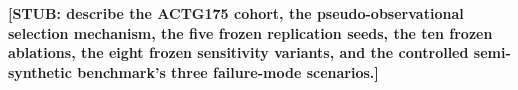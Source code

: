 \textbf{[STUB: describe the ACTG175 cohort, the pseudo-observational
selection mechanism, the five frozen replication seeds, the ten frozen
ablations, the eight frozen sensitivity variants, and the controlled
semi-synthetic benchmark's three failure-mode scenarios.]}
